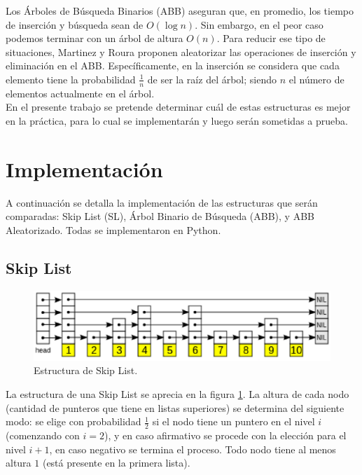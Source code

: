 \documentclass[12pt,letterpaper]{article}
\begin{document}
Los Árboles de Búsqueda Binarios (ABB) aseguran que, en promedio, los tiempo de inserción y búsqueda sean de $O(\log{n})$. Sin embargo, en el peor caso podemos terminar con un árbol de altura $O(n)$. Para reducir ese tipo de situaciones, Martinez y Roura proponen aleatorizar las operaciones de inserción y eliminación en el ABB. Específicamente, en la inserción se considera que cada elemento tiene la probabilidad $\frac{1}{n}$ de ser la raíz del árbol; siendo $n$ el número de elementos actualmente en el árbol.\\

En el presente trabajo se pretende determinar cuál de estas estructuras es mejor en la práctica, para lo cual se implementarán y luego serán sometidas a prueba.

\section{Implementación}
A continuación se detalla la implementación de las estructuras que serán comparadas: Skip List (SL), Árbol Binario de Búsqueda (ABB), y ABB Aleatorizado. Todas se implementaron en Python.

\subsection{Skip List}
\label{sec:sl}

\begin{figure}[ht]
\centering
\includegraphics[scale=0.75]{skiplist.eps}
\caption{Estructura de Skip List.}
\label{fig:skip}
\end{figure}

La estructura de una Skip List se aprecia en la figura \ref{fig:skip}. La altura de cada nodo (cantidad de punteros que tiene en listas superiores) se determina del siguiente modo: se elige con probabilidad $\frac{1}{2}$ si el nodo tiene un puntero en el nivel $i$ (comenzando con $i=2$), y en caso afirmativo se procede con la elección para el nivel $i+1$, en caso negativo se termina el proceso. Todo nodo tiene al menos altura $1$ (está presente en la primera lista).\\
\end{document}
